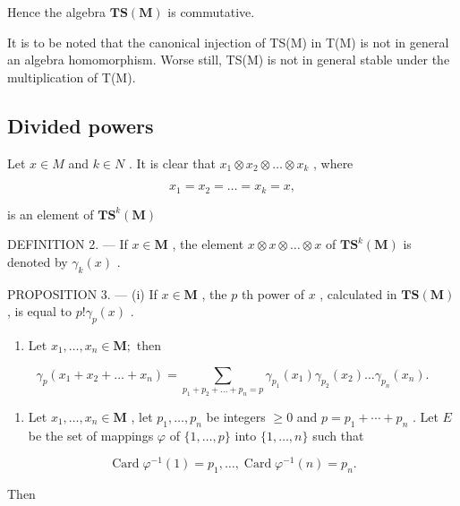 Hence the algebra \(\mathbf{TS}(\mathbf{M})\) is commutative.

It is to be noted that the canonical injection of TS(M) in T(M) is not in general an algebra homomorphism. Worse still, TS(M) is not in general stable under the multiplication of T(M).

\subsection{Divided powers}

Let \(x \in M\) and \(k \in N\) . It is clear that \(x_1 \otimes x_2 \otimes \ldots \otimes x_k\) , where

\[
x _ {1} = x _ {2} = \dots = x _ {k} = x,
\]

is an element of \(\mathbf{TS}^k (\mathbf{M})\)

DEFINITION 2. --- If \(x \in \mathbf{M}\) , the element \(x \otimes x \otimes \ldots \otimes x\) of \(\mathbf{T}\mathbf{S}^k(\mathbf{M})\) is denoted by \(\gamma_k(x)\) .

PROPOSITION 3. --- (i) If \(x \in \mathbf{M}\) , the \(p\) th power of \(x\) , calculated in \(\mathbf{T}\mathbf{S}(\mathbf{M})\) , is equal to \(p! \gamma_p(x)\) .

\begin{enumerate}
\def\labelenumi{(\roman{enumi})}
\setcounter{enumi}{1}
\tightlist
\item
  Let \(x_{1},\ldots ,x_{n}\in \mathbf{M};\) then
\end{enumerate}

\[
\gamma_ {p} \left(x _ {1} + x _ {2} + \dots + x _ {n}\right) = \sum_ {p _ {1} + p _ {2} + \dots + p _ {n} = p} \gamma_ {p _ {1}} \left(x _ {1}\right) \gamma_ {p _ {2}} \left(x _ {2}\right) \dots \gamma_ {p _ {n}} \left(x _ {n}\right).
\]

\begin{enumerate}
\def\labelenumi{(\roman{enumi})}
\setcounter{enumi}{2}
\tightlist
\item
  Let \(x_1, \ldots, x_n \in \mathbf{M}\) , let \(p_1, \ldots, p_n\) be integers \(\geqslant 0\) and \(p = p_1 + \cdots + p_n\) . Let \(E\) be the set of mappings \(\varphi\) of \(\{1, \ldots, p\}\) into \(\{1, \ldots, n\}\) such that
\end{enumerate}

\[
\operatorname{Card} \varphi^ {- 1} (1) = p _ {1}, \dots , \operatorname{Card} \varphi^ {- 1} (n) = p _ {n}.
\]

Then

